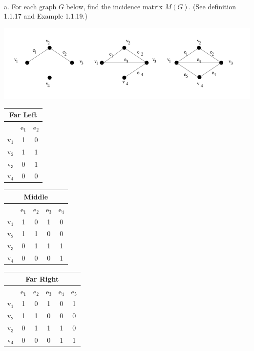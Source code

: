 \documentclass[12pt]{article}
\newenvironment{question}[2][Question]{\begin{trivlist}
\item[\hskip \labelsep {\bfseries #1}\hskip \labelsep {\bfseries #2.}]}{\end{trivlist}}
\begin{document}
\begin{align*}
\end{align*}

\begin{question}{8}
a. For each graph $G$ below, find the incidence matrix $M(G)$. (See definition 1.1.17 and Example 1.1.19.)
\begin{center}
\includegraphics{q8.png}
\end{center}
\end{question}

\begin{tabular}{|c|c|c|} 
\multicolumn{3}{c}{Far Left}  \\ \hline
 & e$_1$ & e$_2$ \\ \hline
v$_1$ & 1 & 0 \\ \hline
v$_2$ & 1 & 1 \\ \hline
v$_3$ & 0 & 1 \\ \hline
v$_4$ & 0 & 0 \\ \hline
\end{tabular}

\begin{tabular}{|c|c|c|c|c|} 
\multicolumn{5}{c}{Middle}  \\ \hline
 & e$_1$ & e$_2$ & e$_3$ & e$_4$ \\ \hline
v$_1$ & 1 & 0 & 1 & 0 \\ \hline
v$_2$ & 1 & 1 & 0 & 0 \\ \hline
v$_3$ & 0 & 1 & 1 & 1 \\ \hline
v$_4$ & 0 & 0 & 0 & 1\\ \hline
\end{tabular}

\begin{tabular}{|c|c|c|c|c|c|} 
\multicolumn{6}{c}{Far Right}  \\ \hline
 & e$_1$ & e$_2$ & e$_3$ & e$_4$ & e$_5$\\ \hline
v$_1$ & 1 & 0 & 1 & 0 & 1 \\ \hline
v$_2$ & 1 & 1 & 0 & 0 & 0 \\ \hline
v$_3$ & 0 & 1 & 1 & 1 & 0 \\ \hline
v$_4$ & 0 & 0 & 0 & 1 & 1 \\ \hline
\end{tabular}
\end{document}
